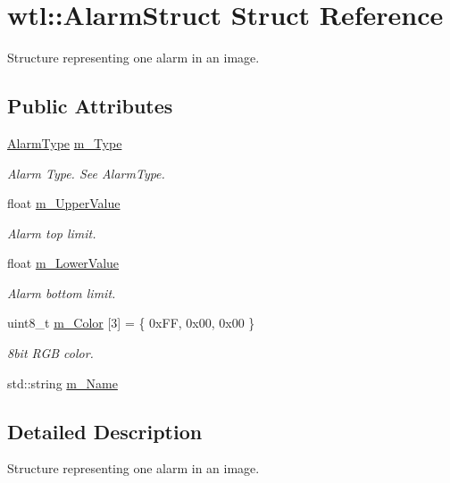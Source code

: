 \hypertarget{structwtl_1_1_alarm_struct}{}\section{wtl\+:\+:Alarm\+Struct Struct Reference}
\label{structwtl_1_1_alarm_struct}


Structure representing one alarm in an image.  


\subsection*{Public Attributes}
\begin{DoxyCompactItemize}
\item 
\hyperlink{namespacewtl_ac9fb2a665b6cd51719a16aba276874f2}{Alarm\+Type} \hyperlink{structwtl_1_1_alarm_struct_a1be347094b0af477acb6cec1e58f7dce}{m\+\_\+\+Type}
\begin{DoxyCompactList}\small\item\em Alarm Type. See Alarm\+Type. \end{DoxyCompactList}\item 
float \hyperlink{structwtl_1_1_alarm_struct_ad1a16ee3022311c4352db1dba8c01be2}{m\+\_\+\+Upper\+Value}
\begin{DoxyCompactList}\small\item\em Alarm top limit. \end{DoxyCompactList}\item 
float \hyperlink{structwtl_1_1_alarm_struct_ad0fe1283b390f1576469a134c8c07feb}{m\+\_\+\+Lower\+Value}
\begin{DoxyCompactList}\small\item\em Alarm bottom limit. \end{DoxyCompactList}\item 
uint8\+\_\+t \hyperlink{structwtl_1_1_alarm_struct_a4e092eb63aa5f44d1f1283d662f3848e}{m\+\_\+\+Color} \mbox{[}3\mbox{]} = \{ 0x\+F\+F, 0x00, 0x00 \}
\begin{DoxyCompactList}\small\item\em 8bit R\+GB color. \end{DoxyCompactList}\item 
std\+::string \hyperlink{structwtl_1_1_alarm_struct_a38293bac8f40e7449d83bfbd9c8a4259}{m\+\_\+\+Name}
\end{DoxyCompactItemize}


\subsection{Detailed Description}
Structure representing one alarm in an image. 

